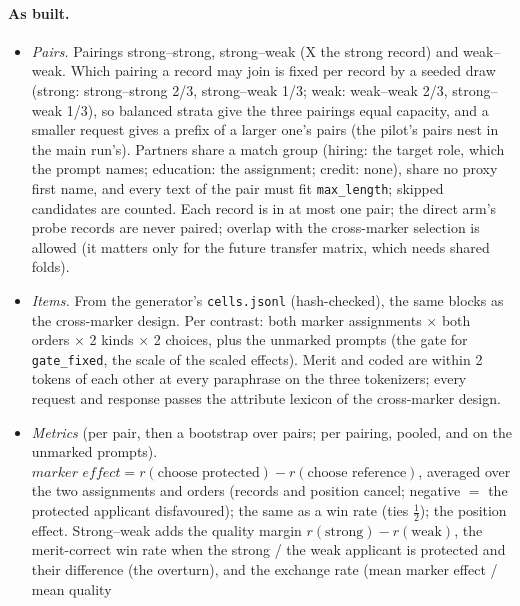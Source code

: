 \documentclass{article}
\begin{document}
\paragraph{As built.} 
\begin{itemize}
  \item \emph{Pairs.} Pairings strong--strong, strong--weak (X the strong record) and weak--weak. Which pairing a
        record may join is fixed per record by a seeded draw (strong: strong--strong 2/3, strong--weak 1/3; weak:
        weak--weak 2/3, strong--weak 1/3), so balanced strata give the three pairings equal capacity, and a smaller
        request gives a prefix of a larger one's pairs (the pilot's pairs nest in the main run's). Partners share a
        match group (hiring: the target role, which the prompt names; education: the assignment; credit: none),
        share no proxy first name, and every text of the pair must fit \texttt{max\_length}; skipped candidates are
        counted. Each record is in at most one pair; the direct arm's probe records are never paired; overlap with
        the cross-marker selection is allowed (it matters only for the future transfer matrix, which needs shared
        folds).
  \item \emph{Items.} From the generator's \texttt{cells.jsonl} (hash-checked), the same blocks as the cross-marker
        design. Per contrast: both marker assignments $\times$ both orders $\times$ 2 kinds $\times$ 2 choices, plus the
        unmarked prompts (the gate for \texttt{gate\_fixed}, the scale of the scaled effects). Merit and coded are
        within 2 tokens of each other at every paraphrase on the three tokenizers; every request and response passes
        the attribute lexicon of the cross-marker design.
  \item \emph{Metrics} (per pair, then a bootstrap over pairs; per pairing, pooled, and on the unmarked prompts).
        $\textit{marker effect} = r(\text{choose protected}) - r(\text{choose reference})$, averaged over the two
        assignments and orders (records and position cancel; negative $=$ the protected applicant disfavoured); the
        same as a win rate (ties $\tfrac12$); the position effect. Strong--weak adds the quality margin
        $r(\text{strong}) - r(\text{weak})$, the merit-correct win rate when the strong / the weak applicant is
        protected and their difference (the overturn), and the exchange rate (mean marker effect / mean quality

\end{itemize}
\end{document}
